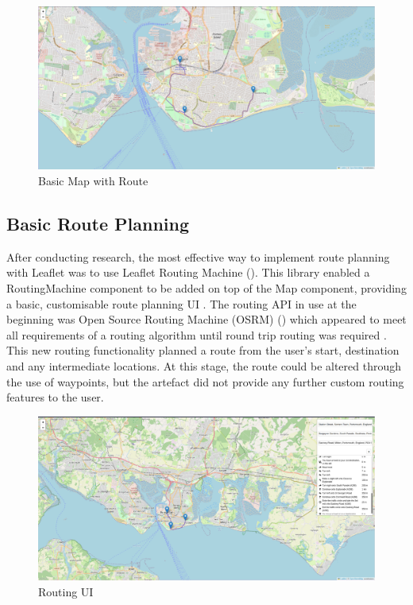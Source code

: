 \begin{figure}[!ht]
    \centering
    \includegraphics[width=425px]{figures/Progress Images/Iteration-1/SR25/Basic Route.png}
    \caption{Basic Map with Route}
    \label{fig:basic-map-with-route}
\end{figure}

\subsection{Basic Route Planning}
\label{iteration1:basic-routing}
After conducting research, the most effective way to implement route planning with Leaflet was to use Leaflet Routing Machine (\cite{noauthor_leaflet_nodate-1}). This library enabled a RoutingMachine component to be added on top of the Map component, providing a basic, customisable route planning UI . The routing API in use at the beginning was Open Source Routing Machine (OSRM) (\cite{noauthor_project_nodate}) which appeared to meet all requirements of a routing algorithm until round trip routing was required . This new routing functionality planned a route from the user's start, destination and any intermediate locations. At this stage, the route could be altered through the use of waypoints, but the artefact did not provide any further custom routing features to the user.
\begin{figure}[!ht]
    \centering
    \includegraphics[width=425px]{figures/Progress Images/Iteration-1/SR1/Basic Destination Overlay Set up.png}
    \caption{Routing UI}
    \label{fig:routing-ui}
  \end{figure}

